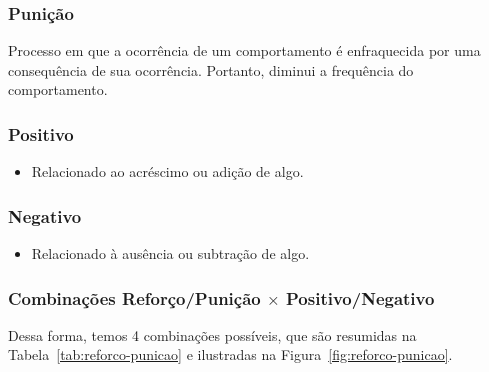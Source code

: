 \documentclass{article}
\begin{document}
            \subsubsection{Punição}
            
                Processo em que a ocorrência de um comportamento é enfraquecida por uma consequência de sua ocorrência. Portanto, diminui a frequência do comportamento.
                
            \subsubsection{Positivo}
            
                \begin{itemize}
                    \item Relacionado ao acréscimo ou adição de algo.
                \end{itemize}
            
            \subsubsection{Negativo}
    
                \begin{itemize}
                    \item Relacionado à ausência ou subtração de algo.
                \end{itemize}
            
            \subsubsection{Combinações Reforço/Punição \texorpdfstring{$\times$}{TEXT} Positivo/Negativo}
            
                Dessa forma, temos 4 combinações possíveis, que são resumidas na Tabela~\ref{tab:reforco-punicao} e ilustradas na Figura~\ref{fig:reforco-punicao}.
            
\end{document}
